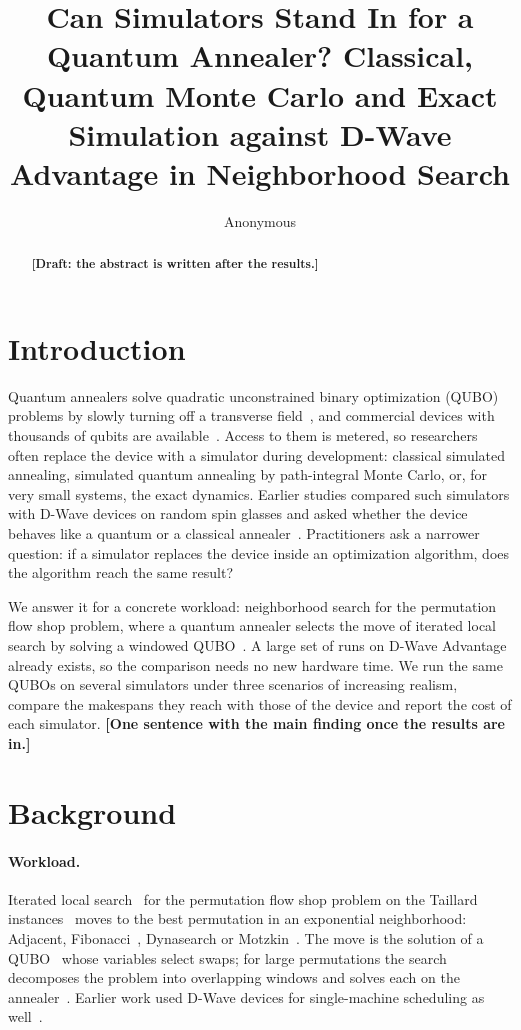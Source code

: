 \documentclass[11pt]{article}
\title{Can Simulators Stand In for a Quantum Annealer? Classical, Quantum
Monte Carlo and Exact Simulation against D-Wave Advantage in Neighborhood
Search}
\author{Anonymous}
\date{}
\newcommand{\tofill}[1]{\textbf{[#1]}}
\begin{document}
\maketitle

\begin{abstract}
\tofill{Draft: the abstract is written after the results.}
\end{abstract}

\section{Introduction}

Quantum annealers solve quadratic unconstrained binary optimization (QUBO)
problems by slowly turning off a transverse field~\cite{kadowaki1998,albash2018aqc},
and commercial devices with thousands of qubits are available~\cite{johnson2011manufactured}.
Access to them is metered, so researchers often replace the device with a
simulator during development: classical simulated annealing, simulated quantum
annealing by path-integral Monte Carlo, or, for very small systems, the exact
dynamics. Earlier studies compared such simulators with D-Wave devices on
random spin glasses and asked whether the device behaves like a quantum or a
classical annealer~\cite{boixo2014evidence,ronnow2014speedup}. Practitioners ask
a narrower question: if a simulator replaces the device inside an optimization
algorithm, does the algorithm reach the same result?

We answer it for a concrete workload: neighborhood search for the permutation
flow shop problem, where a quantum annealer selects the move of iterated local
search by solving a windowed
QUBO~\cite{wojewodzki2026windowed,wojewodzki2026bpasts}. A large set of runs on
D-Wave Advantage already exists, so the comparison needs no new hardware time.
We run the same QUBOs on several simulators under three scenarios of
increasing realism, compare the makespans they reach with those of the device
and report the cost of each simulator. \tofill{One sentence with the main
finding once the results are in.}

\section{Background}

\paragraph{Workload.}
Iterated local search~\cite{lourenco2003} for the permutation flow shop
problem on the Taillard instances~\cite{taillard1993} moves to the best
permutation in an exponential neighborhood: Adjacent, Fibonacci~\cite{bozejko2026new},
Dynasearch or Motzkin~\cite{wojewodzki2026soco}. The move is the solution of a
QUBO~\cite{lucas2014ising,glover2019} whose variables select swaps; for large
permutations the search decomposes the problem into overlapping windows and
solves each on the annealer~\cite{wojewodzki2026windowed}. Earlier work used
D-Wave devices for single-machine scheduling as well~\cite{bozejko2022distributed}.
\end{document}
